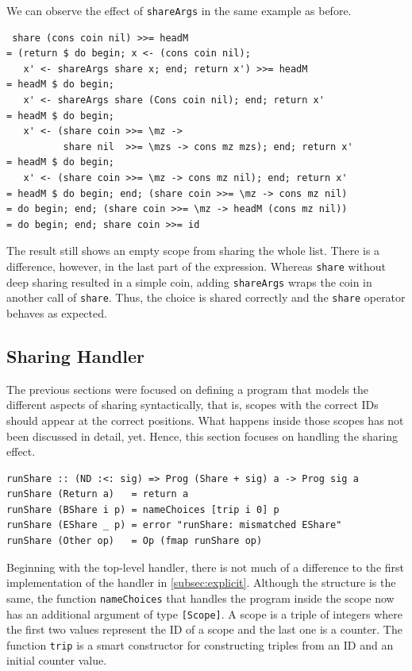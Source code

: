 \documentclass[a4paper, 11pt, fleqn, twoside]{scrreprt}
\newcommand{\hinl}[1]{\texttt{#1}}
\begin{document}
We can observe the effect of \hinl{shareArgs} in the same example as before.

\begin{verbatim}
 share (cons coin nil) >>= headM
= (return $ do begin; x <- (cons coin nil); 
   x' <- shareArgs share x; end; return x') >>= headM
= headM $ do begin; 
   x' <- shareArgs share (Cons coin nil); end; return x'
= headM $ do begin; 
   x' <- (share coin >>= \mz -> 
          share nil  >>= \mzs -> cons mz mzs); end; return x'
= headM $ do begin; 
   x' <- (share coin >>= \mz -> cons mz nil); end; return x'
= headM $ do begin; end; (share coin >>= \mz -> cons mz nil)
= do begin; end; (share coin >>= \mz -> headM (cons mz nil))
= do begin; end; share coin >>= id
\end{verbatim}

The result still shows an empty scope from sharing the whole list.
There is a difference, however, in the last part of the expression.
Whereas \hinl{share} without deep sharing resulted in a simple coin, adding \hinl{shareArgs} wraps the coin in another call of \hinl{share}.
Thus, the choice is shared correctly and the \hinl{share} operator behaves as expected.

\subsection{Sharing Handler}
The previous sections were focused on defining a program that models the different aspects of sharing syntactically, that is, scopes with the correct IDs should appear at the correct positions.
What happens inside those scopes has not been discussed in detail, yet.
Hence, this section focuses on handling the sharing effect.

\begin{verbatim}
runShare :: (ND :<: sig) => Prog (Share + sig) a -> Prog sig a
runShare (Return a)   = return a
runShare (BShare i p) = nameChoices [trip i 0] p
runShare (EShare _ p) = error "runShare: mismatched EShare"
runShare (Other op)   = Op (fmap runShare op)
\end{verbatim}

Beginning with the top-level handler, there is not much of a difference to the first implementation of the handler in \autoref{subsec:explicit}.
Although the structure is the same, the function \hinl{nameChoices} that handles the program inside the scope now has an additional argument of type \hinl{[Scope]}.
A scope is a triple of integers where the first two values represent the ID of a scope and the last one is a counter.
The function \hinl{trip} is a smart constructor for constructing triples from an ID and an initial counter value.
\end{document}
